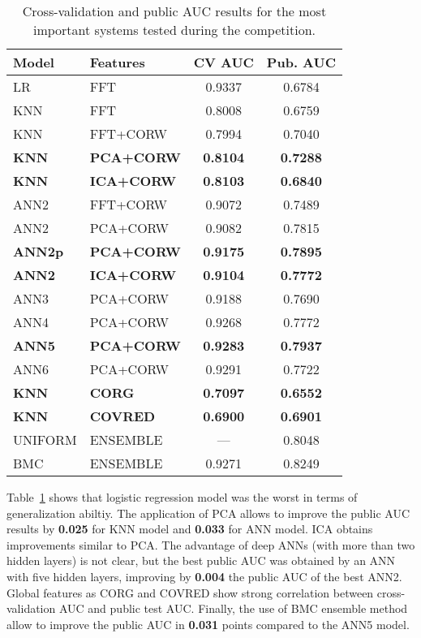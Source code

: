 \documentclass[a4paper,english,twoside]{article}
\begin{document}
\begin{table}
  \centering
  \begin{tabular}{|l|l|cc|}
    \hline
    Model & Features & CV AUC & Pub. AUC\\
    \hline
    \hline
    LR & FFT & 0.9337 & 0.6784\\
    \hline
    KNN & FFT & 0.8008 & 0.6759\\
    KNN & FFT+CORW & 0.7994 & 0.7040\\
    \textbf{KNN} & \textbf{PCA+CORW} & \textbf{0.8104} & \textbf{0.7288}\\
    \textbf{KNN} & \textbf{ICA+CORW} & \textbf{0.8103} & \textbf{0.6840}\\
    \hline
    ANN2 & FFT+CORW & 0.9072 & 0.7489\\
    ANN2 & PCA+CORW & 0.9082 & 0.7815\\
    \textbf{ANN2p} & \textbf{PCA+CORW} & \textbf{0.9175} & \textbf{0.7895}\\
    \textbf{ANN2} & \textbf{ICA+CORW} & \textbf{0.9104} & \textbf{0.7772}\\
    ANN3 & PCA+CORW & 0.9188 & 0.7690\\
    ANN4 & PCA+CORW & 0.9268 & 0.7772\\
    \textbf{ANN5} & \textbf{PCA+CORW} & \textbf{0.9283} & \textbf{0.7937}\\
    ANN6 & PCA+CORW & 0.9291 & 0.7722\\
    \hline
    \textbf{KNN} & \textbf{CORG} & \textbf{0.7097} & \textbf{0.6552}\\
    \textbf{KNN} & \textbf{COVRED} & \textbf{0.6900} & \textbf{0.6901}\\
    \hline
    UNIFORM & ENSEMBLE & --- & 0.8048\\
    BMC & ENSEMBLE & 0.9271 & 0.8249\\
    \hline
  \end{tabular}
  \caption{Cross-validation and public AUC results for the most important
    systems tested during the competition.\label{tab:val}}
\end{table}            

Table~\ref{tab:val} shows that logistic regression model was the worst in
terms of generalization abiltiy. The application of PCA allows to
improve the public AUC results by \textbf{0.025} for KNN model and
\textbf{0.033} for ANN model. ICA obtains improvements similar to PCA.
The advantage of deep ANNs (with more than two hidden layers) is not
clear, but the best public AUC was obtained by an ANN with five hidden
layers, improving by \textbf{0.004} the public AUC of the best ANN2.
Global features as CORG and COVRED show strong correlation between
cross-validation AUC and public test AUC. Finally, the use of BMC
ensemble method allow to improve the public AUC in \textbf{0.031} points
compared to the ANN5 model.
\end{document}
